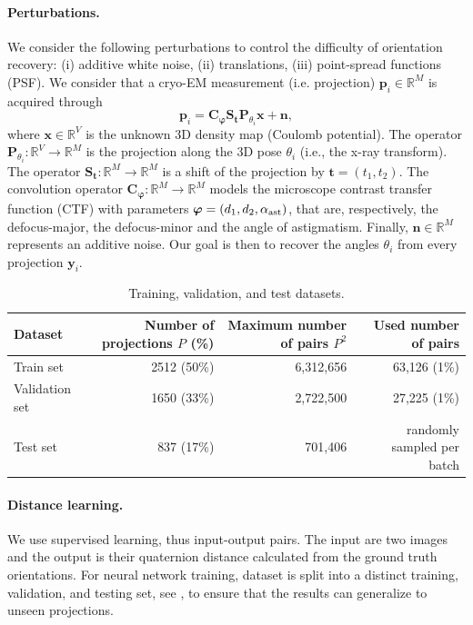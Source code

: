 \paragraph{Perturbations.}
We consider the following perturbations to control the difficulty of orientation recovery: (i) additive white noise, (ii) translations, (iii) point-spread functions (PSF).
We consider that a cryo-EM measurement (i.e. projection) $\mathbf{p}_i \in \mathbb{R}^{M}$ is acquired through
\begin{equation}
\label{eq:linear-forward-model}
\mathbf{p}_i={\mathbf {C}_{\boldsymbol\varphi}}\mathbf S_{\mathbf{t}}\mathbf P_{\theta_i}\mathbf x+\mathbf n,
\end{equation}
where $\mathbf x \in \mathbb{R}^{V}$ is the unknown 3D density map\cite{dimaio_creating_2007} (Coulomb potential). The operator $\mathbf P_{\theta_i}: \mathbb R^V \to \mathbb R^M$ is the projection along the 3D pose $\theta_i$ (i.e., the x-ray transform). The operator $\mathbf S_\mathbf{t}: \mathbb R^M \to \mathbb R^M$ is a shift of the projection by $\mathbf{t}=(t_1, t_2)$. The convolution operator $\mathbf {C}_{\boldsymbol\varphi}: \mathbb R^M \to \mathbb R^M$ models the microscope contrast transfer function (CTF) with parameters $\boldsymbol\varphi=(d_1, d_2, \alpha_{\rm ast})$, that are, respectively, the defocus-major, the defocus-minor and the angle of astigmatism. Finally, $\mathbf n \in \mathbb{R}^{M}$ represents an additive noise. Our goal is then to recover the angles $\theta_i$ from every projection $\mathbf y_i$. 

\begin{table}[ht!]
    \centering
    \begin{tabular}{lrrr}
        \toprule
        Dataset & Number of projections $P$ (\%) & Maximum number of pairs $P^2$ & Used number of pairs \\
        \midrule
        Train set & 2512 (50\%) & 6,312,656 & 63,126 (1\%) \\
        Validation set & 1650 (33\%) & 2,722,500 & 27,225 (1\%) \\
        Test set & 837 (17\%) & 701,406 & randomly sampled per batch \\
        \bottomrule
    \end{tabular}
    \caption{Training, validation, and test datasets.}\label{tab:dataset}
\end{table}

\paragraph{Distance learning.}
We use supervised learning, thus input-output pairs.
The input are two images and the output is their quaternion distance calculated from the ground truth orientations.
For neural network training, dataset is split into a distinct training, validation, and testing set, see , to ensure that the results can generalize to unseen projections.


